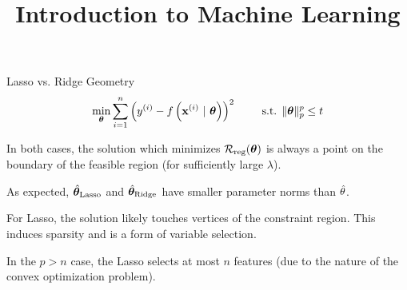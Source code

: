 \documentclass[11pt,compress,t,notes=noshow, xcolor=table]{beamer}
\title{Introduction to Machine Learning}
\date{}
\begin{document}
 

\begin{vbframe}{Lasso vs. Ridge Geometry}
$$ 
  \min_{\bm{\theta}} \sum\limits_{i=1}^n \left(y^{(i)} - f\left(\mathbf{x}^{(i)} ~|~ \bm{\theta}\right)\right)^2 \qquad \text{ s.t. } \|\bm{\theta}\|_p^p  \leq t 
$$ 
  \vspace{-0.5cm}
  \begin{figure}
    \centering
  \end{figure}

  \begin{itemize}
    \item \small{In both cases, the solution which minimizes $\mathcal{R}_{\text{reg}}(\bm{\theta})$ is always a point on the boundary of the feasible region (for sufficiently large $\lambda$).
    \item As expected, $\hat{\bm{\theta}}_{\text{Lasso}}$ and $\hat{\bm{\theta}}_{\text{Ridge}}$ have smaller parameter norms than $\hat{\theta}$.}
    \item For Lasso, the solution likely touches vertices of the constraint region. This induces sparsity and is a form of variable selection.
    \item In the $p>n$ case, the Lasso selects at most $n$ features (due to the nature of the convex optimization problem).
    
  \end{itemize}
  
\end{vbframe}
\end{document}
